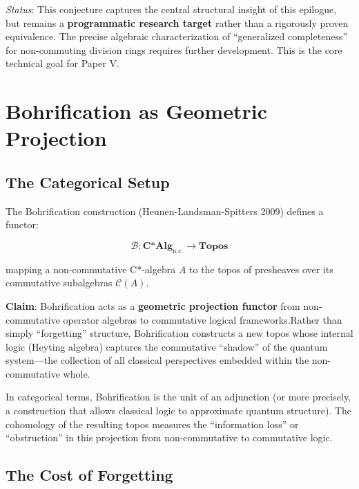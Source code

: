 \documentclass[11pt]{article}
\begin{document}
\emph{Status}: This conjecture captures the central structural insight of this epilogue, but remains a \textbf{programmatic research target} rather than a rigorously proven equivalence. The precise algebraic characterization of ``generalized completeness'' for non-commuting division rings requires further development. This is the core technical goal for Paper V.



\section{Bohrification as Geometric Projection}
\label{bohrification-as-geometric-projection}

\subsection{The Categorical Setup}
\label{the-categorical-setup}

The Bohrification construction (Heunen-Landsman-Spitters 2009) defines a functor:

\[\mathcal{B}: \mathbf{C\text{*}Alg}_{\text{n.c.}} \to \mathbf{Topos}\]

mapping a non-commutative C*-algebra \(A\) to the topos of presheaves over its commutative subalgebras \(\mathcal{C}(A)\).

\textbf{Claim}: Bohrification acts as a \textbf{geometric projection functor} from non-commutative operator algebras to commutative logical frameworks.\linebreak Rather than simply ``forgetting'' structure, Bohrification constructs a new topos whose internal logic (Heyting algebra) captures the commutative ``shadow'' of the quantum system---the collection of all classical perspectives embedded within the non-commutative whole.

In categorical terms, Bohrification is the unit of an adjunction (or more precisely, a construction that allows classical logic to approximate quantum structure). The cohomology of the resulting topos measures the ``information loss'' or ``obstruction'' in this projection from non-commutative to commutative logic.

\subsection{The Cost of Forgetting}
\label{the-cost-of-forgetting}
\end{document}
